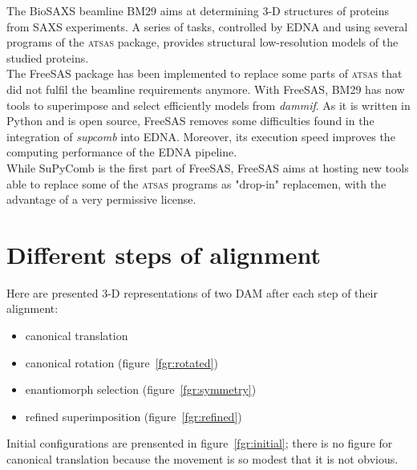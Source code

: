 \documentclass[a4paper, 11pt]{report}
\begin{document}
The BioSAXS beamline BM29 aims at determining 3-D structures of 
proteins from SAXS experiments. 
A series of tasks, controlled by EDNA and using several programs of 
the \textsc{atsas} package, provides structural low-resolution models 
of the studied proteins.\\

The FreeSAS package has been implemented to replace some parts of 
\textsc{atsas} that did not fulfil the beamline requirements anymore. 
With FreeSAS, BM29 has now tools to superimpose and select efficiently 
models from \textit{dammif}. 
As it is written in Python and is open source, FreeSAS removes some 
difficulties found in the integration of \textit{supcomb} into EDNA. 
Moreover, its execution speed improves the computing performance of 
the EDNA pipeline.\\

While SuPyComb is the first part of FreeSAS, FreeSAS aims at hosting 
new tools able to replace some of the \textsc{atsas} programs as 
"drop-in" replacemen, with the advantage of a very permissive license.


\newpage                 %



\appendix


\chapter{Different steps of alignment}
\label{alignstep}

Here are presented 3-D representations of two DAM after each step of 
their alignment:
\begin{itemize}
\item canonical translation
\item canonical rotation (figure~\ref{fgr:rotated})
\item enantiomorph selection (figure~\ref{fgr:symmetry})
\item refined superimposition (figure~\ref{fgr:refined})
\end{itemize}
Initial configurations are prensented in figure~\ref{fgr:initial}; there is 
no figure for canonical translation because the movement is so modest 
that it is not obvious.
\end{document}
